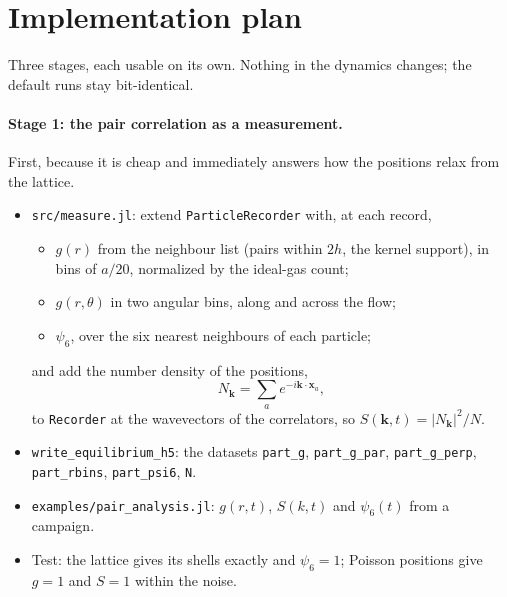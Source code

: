 \documentclass[11pt,aps,preprint,nofootinbib,superscriptaddress,tightenlines]{revtex4-2}
\def\st{\begin{equation}}
\def\stp{\end{equation}}
\let\oldparagraph\paragraph
\renewcommand{\paragraph}{\par\bigskip\oldparagraph}
\begin{document}
\section{Implementation plan}
\label{sec:plan}

Three stages, each usable on its own.  Nothing in the dynamics changes; the default runs stay bit-identical.

\paragraph{Stage 1: the pair correlation as a measurement.}  First, because it is cheap and immediately answers how the
positions relax from the lattice.
\begin{itemize}
\item \texttt{src/measure.jl}: extend \texttt{ParticleRecorder} with, at each record,
  \begin{itemize}
  \item $g(r)$ from the neighbour list (pairs within $2h$, the kernel support), in bins of $a/20$, normalized by the ideal-gas count;
  \item $g(r,\theta)$ in two angular bins, along and across the flow;
  \item $\psi_6$, over the six nearest neighbours of each particle;
  \end{itemize}
  and add the number density of the positions,
  \st
  N_{\bm k}=\sum_ae^{-i\bm k\cdot\bm x_a},
  \stp
  to \texttt{Recorder} at the wavevectors of the correlators, so $S(\bm k,t)=|N_{\bm k}|^2/N$.
\item \texttt{write\_equilibrium\_h5}: the datasets \texttt{part\_g}, \texttt{part\_g\_par}, \texttt{part\_g\_perp}, \texttt{part\_rbins},
  \texttt{part\_psi6}, \texttt{N}.
\item \texttt{examples/pair\_analysis.jl}: $g(r,t)$, $S(k,t)$ and $\psi_6(t)$ from a campaign.
\item Test: the lattice gives its shells exactly and $\psi_6=1$; Poisson positions give $g=1$ and $S=1$ within the noise.
\end{itemize}
\medskip
\noindent{}
\end{document}
